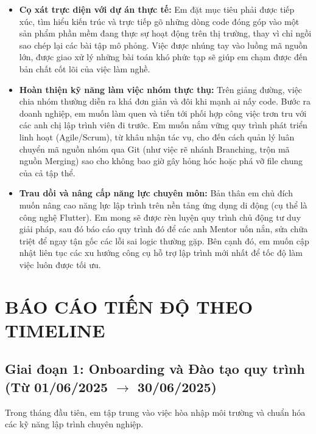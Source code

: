 \documentclass[12pt, a4paper]{article}
\begin{document}
\begin{itemize}
    \item \textbf{Cọ xát trực diện với dự án thực tế:} 
    Em đặt mục tiêu phải được tiếp xúc, tìm hiểu kiến trúc và trực tiếp gõ những dòng code đóng góp vào một sản phẩm phần mềm đang thực sự hoạt động trên thị trường, thay vì chỉ ngồi sao chép lại các bài tập mô phỏng. Việc được nhúng tay vào luồng mã nguồn lớn, được giao xử lý những bài toán khó phức tạp sẽ giúp em chạm được đến bản chất cốt lõi của việc làm nghề.

    \item \textbf{Hoàn thiện kỹ năng làm việc nhóm thực thụ:} 
    Trên giảng đường, việc chia nhóm thường diễn ra khá đơn giản và đôi khi mạnh ai nấy code. Bước ra doanh nghiệp, em muốn làm quen và tiến tới phối hợp công việc trơn tru với các anh chị lập trình viên đi trước. Em muốn nắm vững quy trình phát triển linh hoạt (Agile/Scrum), từ khâu nhận tác vụ, cho đến cách quản lý luân chuyển mã nguồn nhóm qua Git (như việc rẽ nhánh Branching, trộn mã nguồn Merging) sao cho không bao giờ gây hỏng hóc hoặc phá vỡ file chung của cả tập thể.

    \item \textbf{Trau dồi và nâng cấp năng lực chuyên môn:} 
    Bản thân em chủ đích muốn nâng cao năng lực lập trình trên nền tảng ứng dụng di động (cụ thể là công nghệ Flutter). Em mong sẽ được rèn luyện quy trình chủ động tư duy giải pháp, sau đó báo cáo quy trình đó để các anh Mentor uốn nắn, sửa chữa triệt để ngay tận gốc các lỗi sai logic thường gặp. Bên cạnh đó, em muốn cập nhật liên tục các xu hướng công cụ hỗ trợ lập trình mới nhất để tốc độ làm việc luôn được tối ưu.
\end{itemize}

\section{BÁO CÁO TIẾN ĐỘ THEO TIMELINE}

\subsection[Giai đoạn 1: Onboarding và Đào tạo quy trình (Từ 01/06/2025 đến 30/06/2025)]{Giai đoạn 1: Onboarding và Đào tạo quy trình \\(Từ 01/06/2025 $\rightarrow$ 30/06/2025)}
Trong tháng đầu tiên, em tập trung vào việc hòa nhập môi trường và chuẩn hóa các kỹ năng lập trình chuyên nghiệp.
\end{document}
